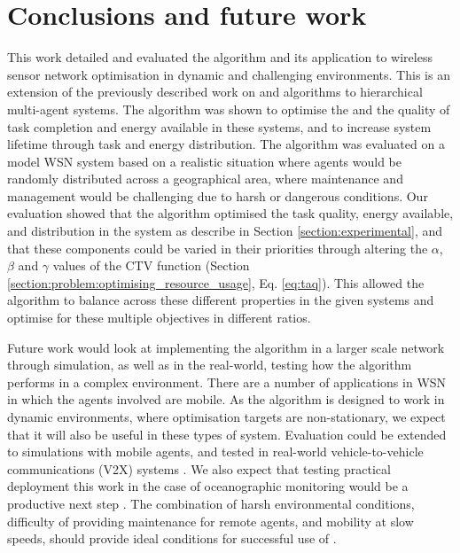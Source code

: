 \section{Conclusions and future work}
\label{section:conclusions}

This work detailed and evaluated the \acronymWSNOptimisation{}{} algorithm and its application to wireless sensor network optimisation in dynamic and challenging environments. This is an extension of the previously described work on \acronymATARIA{}{} and \acronymMGRAO{}{} algorithms \citep{creech2021dynamic,creech2021resource} to hierarchical multi-agent systems. The algorithm was shown to optimise the and the quality of task completion and energy available in these systems, and to increase system lifetime through task and energy distribution. The algorithm was evaluated on a model WSN system based on a realistic situation where agents would be randomly distributed across a geographical area, where maintenance and management would be challenging due to harsh or dangerous conditions.  Our evaluation showed that the \acronymWSNOptimisation{}{} algorithm optimised the task quality, energy available, and distribution in the system as describe in Section \ref{section:experimental}, and that these components could be varied in their priorities through altering the $\alpha$, $\beta$ and $\gamma$ values of the CTV function (Section \ref{section:problem:optimising_resource_usage}, Eq. \ref{eq:taq}). This allowed the algorithm to balance across these different properties in the given systems and optimise for these multiple objectives in different ratios. 

Future work would look at implementing the algorithm in a larger scale network through simulation, as well as in the real-world, testing how the algorithm performs in a complex environment. There are a number of applications in WSN in which the agents involved are mobile. As the \acronymWSNOptimisation{}{} algorithm is designed to work in dynamic environments, where optimisation targets are non-stationary, we expect that it will also be useful in these types of system. Evaluation could be extended to simulations with mobile agents, and tested in real-world vehicle-to-vehicle communications (V2X) systems \citep{Gupta2017, Tong2019}. We also expect that testing practical deployment this work in the case of oceanographic monitoring would be a productive next step \citep{Albaladejo2010a}. The combination of harsh environmental conditions, difficulty of providing maintenance for remote agents, and mobility at slow speeds, should provide ideal conditions for successful use of \acronymWSNOptimisation{}{}.


  